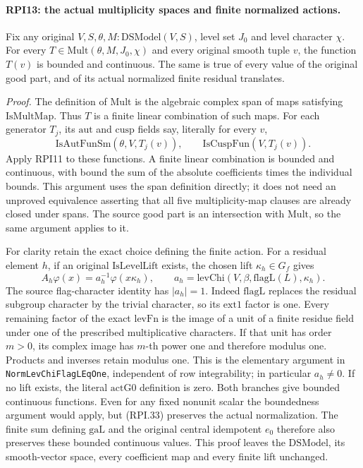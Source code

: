 \paragraph{RPI13: the actual multiplicity spaces and finite normalized actions.}
\label{claim:RPI13}
Fix any original \(V,S,\theta,M:\mathrm{DSModel}(V,S)\),
level set \(J_0\) and level character \(\chi\).
For every
\(T\in\mathrm{Mult}(\theta,M,J_0,\chi)\)
and every original smooth tuple \(v\), the function \(T(v)\)
is bounded and continuous.  The same is true of every
value of the original good part, and of its actual
normalized finite residual translates.

\emph{Proof.}
The definition of \(\mathrm{Mult}\) is the algebraic
complex span of maps satisfying \(\mathrm{IsMultMap}\).
Thus \(T\) is a finite linear combination of such maps.
For each generator \(T_j\), its \(\mathrm{aut}\) and
\(\mathrm{cusp}\) fields say, literally for every \(v\),
\[
 \mathrm{IsAutFunSm}(\theta,V,T_j(v)),\qquad
 \mathrm{IsCuspFun}(V,T_j(v)).
 \tag{RPI.32}
\]
Apply RPI11 to these functions.  A finite linear combination
is bounded and continuous, with bound the sum of the
absolute coefficients times the individual bounds.
This argument uses the span definition directly; it does
not need an unproved equivalence asserting that all five
multiplicity-map clauses are already closed under spans.
The source good part is an intersection with
\(\mathrm{Mult}\), so the same argument applies to it.

For clarity retain the exact choice defining the finite
action.  For a residual element \(h\), if an original
\(\mathrm{IsLevelLift}\) exists, the chosen lift
\(\kappa_h\in G_f\) gives
\[
 A_h\varphi(x)=a_h^{-1}\varphi(x\kappa_h),\qquad
 a_h=\mathrm{levChi}(V,\beta,\mathrm{flagL}(L),\kappa_h).
 \tag{RPI.33}
\]
The source flag-character identity has \(|a_h|=1\).
Indeed \(\mathrm{flagL}\) replaces the residual subgroup
character by the trivial character, so its \(\mathrm{ext1}\)
factor is one.  Every remaining factor of the exact
\(\mathrm{levFn}\) is the image of a unit of a finite residue
field under one of the prescribed multiplicative characters.
If that unit has order \(m>0\), its complex image has
\(m\)-th power one and therefore modulus one.  Products
and inverses retain modulus one.  This is the elementary
argument in \texttt{NormLevChiFlagLEqOne}, independent of
row integrability; in particular \(a_h\ne0\).
If no lift exists, the literal \(\mathrm{actG0}\) definition
is zero.  Both branches give bounded continuous functions.
Even for any fixed nonunit scalar the boundedness argument
would apply, but (RPI.33) preserves the actual normalization.
The finite sum defining \(\mathrm{gaL}\) and the original
central idempotent \(e_0\) therefore also preserves these
bounded continuous values.  This proof leaves the
\(\mathrm{DSModel}\), its smooth-vector space, every
coefficient map and every finite lift unchanged.

